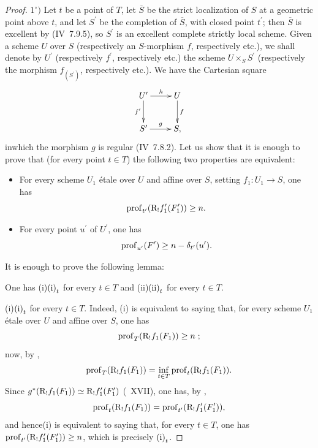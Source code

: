 \begin{proof}
$1^\circ)$ Let $t$ be a point of $T$, let $\overline{S}$ be the strict localization of $S$ at a geometric point above $t$, and let $S^{\prime}$ be the completion of $\overline{S}$, with closed point $t^{\prime}$; then $\overline{S}$ is excellent by (\EGA IV~7.9.5), so $S^{\prime}$ is an excellent complete strictly local scheme. Given a scheme $U$ over $S$ (respectively an $S$-morphism $f$, respectively etc.), we shall denote by $U^{\prime}$ (respectively $f^{\prime}$, respectively etc.) the scheme $U\times_{S}S^{\prime}$ (respectively the morphism $f_{(S^{\prime})}$, respectively etc.). We have the Cartesian square
$$
\xymatrix{ U^{\prime}\ar[r]^-{h}\ar[d]_-{f^{\prime}} & U\ar[d]^-{f}\\
S^{\prime}\ar[r]^-{g} & S, }
$$
in\pageoriginale which the morphism $g$ is regular (\EGA IV~7.8.2). Let us show that it is enough to prove that (for every point $t\in T$) the following two properties are equivalent:
\begin{itemize}
\item[$\textup{(i)}_{t}$] For every scheme $U_{1}$ étale over $U$ and affine over $S$, setting $f_{1}\colon U_{1}\to S$, one has
$$
\operatorname{prof}_{t^{\prime}}(\mathrm R_{!}f_{1}^{\prime}(F_{1}^{\prime}))\geq n.
$$

\item[$\textup{(ii)}_{t}$] For every point $u^{\prime}$ of $U^{\prime}$, one has
$$
\operatorname{prof}_{u^{\prime}}(F^{\prime})\geq n-\delta_{t^{\prime}}(u^{\prime}).
$$
\end{itemize}
It is enough to prove the following lemma:

\begin{sublemme} \label{XIV.4.2.1}
One has \textup{(i)}\SSI$\textup{(i)}_{t}$ for every $t\in T$ and \textup{(ii)}\SSI$\textup{(ii)}_{t}$ for every $t\in T$.
\end{sublemme}

\textup{(i)}\SSI$\textup{(i)}_{t}$ for every $t\in T$. Indeed, \textup{(i)} is equivalent to saying that, for every scheme $U_{1}$ étale over $U$ and affine over $S$, one has
$$
\operatorname{prof}_{T}(\mathrm R_{!}f_{1}(F_{1}))\geq n\;;$$
now, by ,
$$
\operatorname{prof}_{T}(\mathrm R_{!}f_{1}(F_{1}))=\inf_{t\in T}\operatorname{prof}_{t}(\mathrm R_{!}f_{1}(F_{1})).
$$
Since $g^{\ast}(\mathrm R_{!}f_{1}(F_{1}))\simeq\mathrm R_{!}f_{1}^{\prime}(F_{1}^{\prime})$ (~XVII), one has, by ,
$$
\operatorname{prof}_{t}(\mathrm R_{!}f_{1}(F_{1}))=\operatorname{prof}_{t^{\prime}}(\mathrm R_{!}f_{1}^{\prime}(F_{1}^{\prime})),
$$
and hence\pageoriginale \textup{(i)} is equivalent to saying that, for every $t\in T$, one has $\operatorname{prof}_{t^{\prime}}(\mathrm R_{!}f_{1}^{\prime}(F_{1}^{\prime}))\geq n$, which is precisely $\textup{(i)}_{t}$.


\end{proof}
